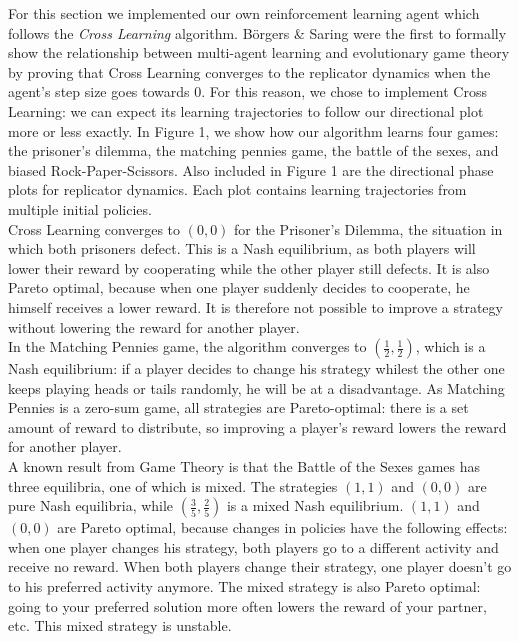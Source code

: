 \documentclass[10pt,a4paper]{article}
\begin{document}
For this section we implemented our own reinforcement learning agent which follows the \textit{Cross Learning} algorithm. B\"{o}rgers \& Saring were the first to formally show the relationship between multi-agent learning and evolutionary game theory by proving that Cross Learning converges to the replicator dynamics when the agent's step size goes towards 0. For this reason, we chose to implement Cross Learning: we can expect its learning trajectories to follow our directional plot more or less exactly. In Figure 1, we show how our algorithm learns four games: the prisoner's dilemma, the matching pennies game, the battle of the sexes, and biased Rock-Paper-Scissors. Also included in Figure 1 are the directional phase plots for replicator dynamics. Each plot contains learning trajectories from multiple initial policies.\\


Cross Learning converges to $(0,0)$ for the Prisoner's Dilemma, the situation in which both prisoners defect. This is a Nash equilibrium, as both players will lower their reward by cooperating while the other player still defects. It is also Pareto optimal, because when one player suddenly decides to cooperate, he himself receives a lower reward. It is therefore not possible to improve a strategy without lowering the reward for another player.\\

In the Matching Pennies game, the algorithm converges to $(\frac{1}{2},\frac{1}{2})$, which is a Nash equilibrium: if a player decides to change his strategy whilest the other one keeps playing heads or tails randomly, he will be at a disadvantage. As Matching Pennies is a zero-sum game, all strategies are Pareto-optimal: there is a set amount of reward to distribute, so improving a player's reward lowers the reward for another player.\\

A known result from Game Theory is that the Battle of the Sexes games has three equilibria, one of which is mixed. The strategies $(1,1)$ and $(0,0)$ are pure Nash equilibria, while $(\frac{3}{5},\frac{2}{5})$ is a mixed Nash equilibrium. $(1,1)$ and $(0,0)$ are Pareto optimal, because changes in policies have the following effects: when one player changes his strategy, both players go to a different activity and receive no reward. When both players change their strategy, one player doesn't go to his preferred activity anymore. The mixed strategy is also Pareto optimal: going to your preferred solution more often lowers the reward of your partner, etc. This mixed strategy is unstable.\\
\end{document}
